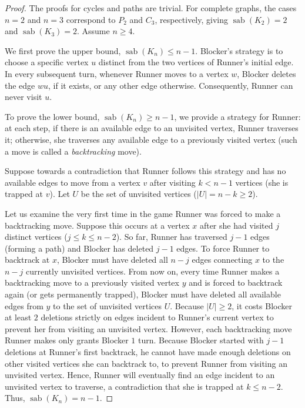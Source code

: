 \documentclass[10pt,a4paper]{amsart}
\DeclareMathOperator{\sab}{\mathrm{sab}}
\begin{document}
\begin{proof}
    The proofs for cycles and paths are trivial. For complete graphs, the cases $n=2$ and $n=3$ correspond to $P_2$ and $C_3$, respectively, giving $\sab(K_2) = 2$ and $\sab(K_3) = 2$. Assume $n \geq 4$. 

    We first prove the upper bound, $\sab(K_n) \leq n-1$. Blocker's strategy is to choose a specific vertex $u$ distinct from the two vertices of Runner's initial edge. In every subsequent turn, whenever Runner moves to a vertex $w$, Blocker deletes the edge $wu$, if it exists, or any other edge otherwise. Consequently, Runner can never visit $u$.

    To prove the lower bound, $\sab(K_n) \geq n-1$, we provide a strategy for Runner: at each step, if there is an available edge to an unvisited vertex, Runner traverses it; otherwise, she traverses any available edge to a previously visited vertex (such a move is called a \emph{backtracking} move).

    Suppose towards a contradiction that Runner follows this strategy and has no available edges to move from a vertex $v$ after visiting $k < n-1$ vertices (she is trapped at $v$). Let $U$ be the set of unvisited vertices ($|U|=n-k \geq 2$). 

    Let us examine the very first time in the game Runner was forced to make a backtracking move. Suppose this occurs at a vertex $x$ after she had visited $j$ distinct vertices ($j \le k \le n-2$). So far, Runner has traversed $j-1$ edges (forming a path) and Blocker has deleted $j-1$ edges. To force Runner to backtrack at $x$, Blocker must have deleted all $n-j$ edges connecting $x$ to the $n-j$ currently unvisited vertices. From now on, every time Runner makes a backtracking move to a previously visited vertex $y$ and is forced to backtrack again (or gets permanently trapped), Blocker must have deleted all available edges from $y$ to the set of unvisited vertices $U$. Because $|U| \ge 2$, it costs Blocker at least $2$ deletions strictly on edges incident to Runner's current vertex to prevent her from visiting an unvisited vertex. However, each backtracking move Runner makes only grants Blocker $1$ turn. Because Blocker started with $j-1$ deletions at Runner's first backtrack, he cannot have made enough deletions on other visited vertices she can backtrack to, to prevent Runner from visiting an unvisited vertex. Hence, Runner will eventually find an edge incident to an unvisited vertex to traverse, a contradiction that she is trapped at $k \le n-2$. Thus, $\sab(K_n) = n-1$.
\end{proof}
\end{document}
